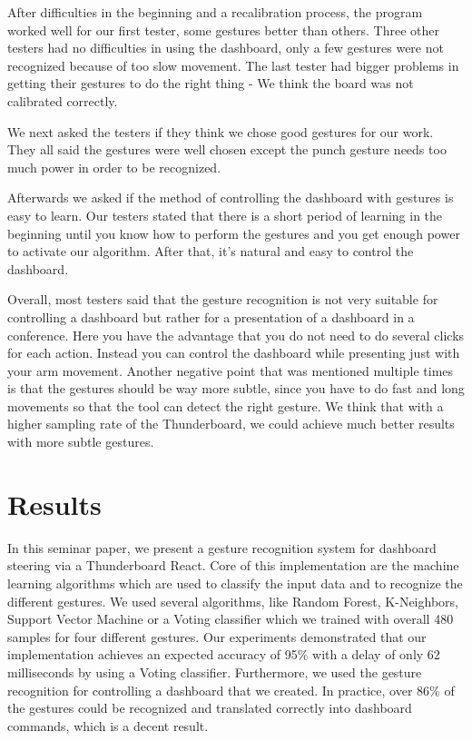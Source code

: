 After difficulties in the beginning and a recalibration process, the program worked well for our first tester, some gestures better than others.
Three other testers had no difficulties in using the dashboard, only a few gestures were not recognized because of too slow movement.
The last tester had bigger problems in getting their gestures to do the right thing - We think the board was not calibrated correctly.

We next asked the testers if they think we chose good gestures for our work.
They all said the gestures were well chosen except the punch gesture needs too much power in order to be recognized.

Afterwards we asked if the method of controlling the dashboard with gestures is easy to learn.
Our testers stated that there is a short period of learning in the beginning until you know how to perform the gestures and you get enough power to activate our algorithm.
After that, it's natural and easy to control the dashboard.

Overall, most testers said that the gesture recognition is not very suitable for controlling a dashboard but rather for a presentation of a dashboard in a conference.
Here you have the advantage that you do not need to do several clicks for each action.
Instead you can control the dashboard while presenting just with your arm movement.
Another negative point that was mentioned multiple times is that the gestures should be way more subtle, since you have to do fast and long movements so that the tool can detect the right gesture.
We think that with a higher sampling rate of the Thunderboard, we could achieve much better results with more subtle gestures.

\chapter{Results}
\label{ch:Results}

In this seminar paper, we present a gesture recognition system for dashboard steering via a Thunderboard React. 
Core of this implementation are the machine learning algorithms which are used to classify the input data and to recognize the different gestures. 
We used several algorithms, like Random Forest, K-Neighbors, Support Vector Machine or a Voting classifier which we trained with overall 480 samples for four different gestures. 
Our experiments demonstrated that our implementation achieves an expected accuracy of 95\% with a delay of only 62 milliseconds by using a Voting classifier. 
Furthermore, we used the gesture recognition for controlling a dashboard that we created. 
In practice, over 86\% of the gestures could be recognized and translated correctly into dashboard commands, which is a decent result. 


